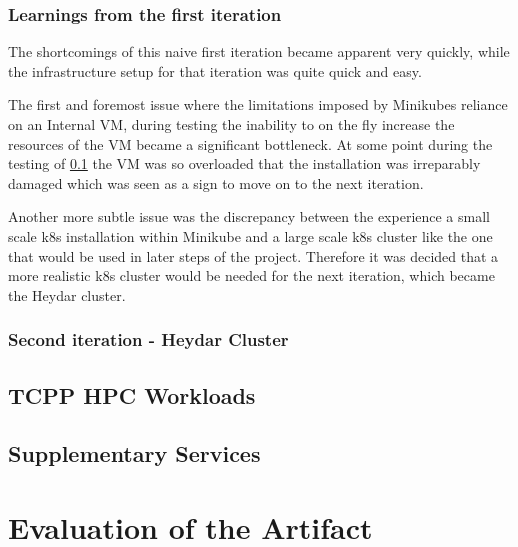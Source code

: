 \subsubsection*{Learnings from the first iteration}

The shortcomings of this naive first iteration became apparent very quickly, 
while the infrastructure setup for that iteration was quite quick and easy.

The first and foremost issue where the limitations imposed by Minikubes reliance on an Internal \ac{VM},
during testing the inability to on the fly increase the resources of the \ac{VM} became a significant bottleneck.
At some point during the testing of \ref{tcpp_hpc_workloads} the \ac{VM} was so overloaded that the installation was irreparably damaged which was seen as a sign to move on to the next iteration.

Another more subtle issue was the discrepancy between the experience a small scale \ac{k8s} installation within Minikube and a large scale \ac{k8s} cluster like the one that would be used in later steps of the project.
Therefore it was decided that a more realistic \ac{k8s} cluster would be needed for the next iteration, which became the Heydar cluster.

\subsubsection{Second iteration - Heydar Cluster}
\label{heydar_cluster}



\subsection{\ac{TCPP} HPC Workloads} 
\label{tcpp_hpc_workloads}

\subsection{Supplementary Services}



\newpage    


\section{Evaluation of the Artifact}

\newpage
